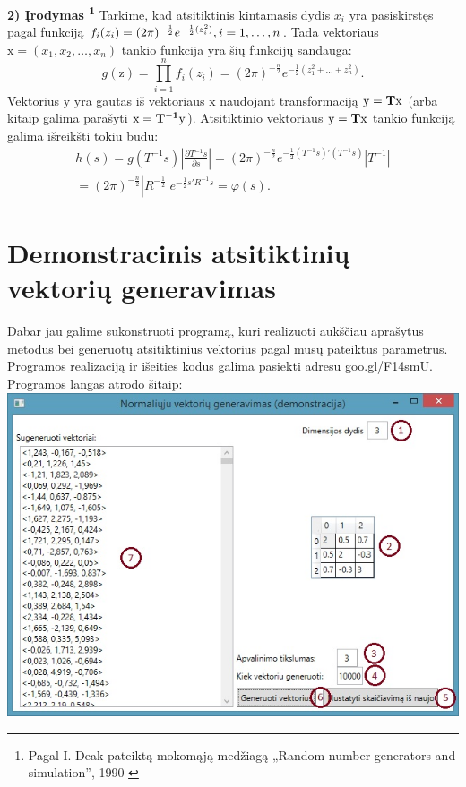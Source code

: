 \documentclass[12pt]{article}
\begin{document}
{\bf 2) Įrodymas \footnote{Pagal I. Deak pateiktą mokomąją medžiagą „Random number generators and simulation”, 1990 \cite[p.~187]{DEAK} }}
Tarkime, kad atsitiktinis kintamasis dydis $x_i$ yra pasiskirstęs pagal funkciją $f_i(z_i)=(2\pi)^{-\frac{1}{2}}e^{-\frac{1}{2}(z_i^2)},\space i = 1, \ldots, n$. Tada vektoriaus $\mathrm{x} = \left(x_1,x_2, \ldots, x_n \right)$ tankio funkcija yra šių funkcijų sandauga:
\begin{equation}
g(\mathrm{z}) = \prod_{i=1}^{n} f_i(z_i) = (2\pi)^{-\frac{n}{2}}e^{-\frac{1}{2}(z_1^2+ \ldots + z_n^2)}. \nonumber
\end{equation}
Vektorius $\mathrm{y}$ yra gautas iš vektoriaus $\mathrm{x}$ naudojant transformaciją $\bf \mathrm{y} = T \mathrm{x}$ (arba kitaip galima parašyti $\bf \mathrm{x} = T^{-1}\mathrm{y}$). 
Atsitiktinio vektoriaus $\mathrm{y} = \bf{T}\mathrm{x}$ tankio funkciją galima išreikšti tokiu būdu:
\begin{equation}
\begin{split}
h(s) = g(T^{-1}s)\left|\frac{\partial T^{-1}s}{\partial s} \right| = (2 \pi)^{-\frac{n}{2}}e^{-\frac{1}{2}(T^{-1}s)'(T^{-1}s)} \left|T^{-1} \right| \\
=(2\pi)^{-\frac{n}{2}}\left| R^{-\frac{1}{2}}\right| e^{-\frac{1}{2}s' R^{-1}s} = \varphi(s). \nonumber
\end{split}
\end{equation}

\section{Demonstracinis atsitiktinių vektorių generavimas}

Dabar jau galime sukonstruoti programą, kuri realizuoti aukščiau aprašytus metodus bei generuotų atsitiktinius vektorius pagal mūsų pateiktus parametrus. Programos realizaciją ir išeities kodus galima pasiekti adresu \href{http://goo.gl/F14smU}{goo.gl/F14smU}.\\

Programos langas atrodo šitaip:\\
\includegraphics[width=13.5cm]{programa}\\
\end{document}
